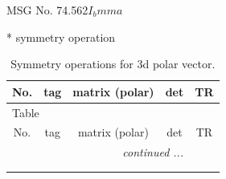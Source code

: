 \documentclass[fleqn,8pt]{jsarticle}
\begin{document}
\setcounter{MaxMatrixCols}{32}

\renewcommand{\tablename}{Table~}
\renewcommand{\figurename}{Figure~}
\begin{center}
\LARGE
MSG No. 74.562\quad$I_{b}mma$
\end{center}
* symmetry operation
\renewcommand{\arraystretch}{1.3}
\begin{longtable}{ccccc}
\caption{Symmetry operations for 3d polar vector.}
 \\
 \hline \hline
No. & tag & matrix (polar) & det & TR \\ \hline \endfirsthead

\multicolumn{4}{l}{\tablename\ \thetable{}} \\
 \hline \hline
No. & tag & matrix (polar) & det & TR \\ \hline \endhead

 \hline \hline
\multicolumn{4}{r}{\footnotesize\it continued ...} \\ \endfoot

 \hline \hline
\multicolumn{4}{r}{} \\ \endlastfoot


\end{longtable}
\end{document}
